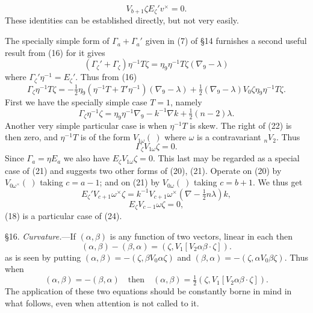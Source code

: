 \documentclass[11pt]{article}
\begin{document}
\begin{equation}V_{b+1}\zeta E_\zeta'v^\times=0.\tag{21}\end{equation}
These identities can be established directly, but not very easily.

The specially simple form of $\Gamma_a+\Gamma_a'$ given in (7) of \S14 furnishes a second useful result from (16) for it gives
\[
(\Gamma_\zeta'+\Gamma_\zeta)\eta^{-1}T\zeta=\eta_9\eta^{-1}T\zeta(\nabla_9-\lambda)
\]
where $\Gamma_\zeta'\eta^{-1}=E_\zeta'$. Thus from (16)
\begin{equation}\Gamma_\zeta\eta^{-1}T\zeta=-\tfrac12\eta_9(\eta^{-1}T+T'\eta^{-1})(\nabla_9-\lambda)+\tfrac12(\nabla_9-\lambda)V_0\zeta\eta_9\eta^{-1}T\zeta.\tag{22}\end{equation}
First we have the specially simple case $T=1$, namely
\begin{equation}\Gamma_\zeta\eta^{-1}\zeta=\eta_9\eta^{-1}\nabla_9-k^{-1}\nabla k+\tfrac12(n-2)\lambda.\tag{23}\end{equation}
Another very simple particular case is when $\eta^{-1}T$ is skew. The right of (22) is then zero, and $\eta^{-1}T$ is of the form $V_{1\omega}(\ )$ where $\omega$ is a contravariant ${}_nV_2$. Thus
\[
\Gamma_\zeta V_{1\omega}\zeta=0.
\]
Since $\Gamma_a=\eta E_a$ we also have $E_\zeta V_{1\omega}\zeta=0$. This last may be regarded as a special case of (21) and suggests two other forms of (20), (21). Operate on (20) by $V_{0\omega^\times}(\ )$ taking $c=a-1$; and on (21) by $V_{0\omega}(\ )$ taking $c=b+1$. We thus get
\begin{equation}E_\zeta'V_{c+1}\omega^\times\zeta=k^{-1}V_{c+1}\omega^\times(\nabla-\tfrac12n\lambda)k,\tag{24}\end{equation}
\begin{equation}E_\zeta V_{c-1}\omega\zeta=0,\tag{25}\end{equation}
(18) is a particular case of (24).

\indent \S16. \emph{Curvature.}---If $(\alpha,\beta)$ is any function of two vectors, linear in each then
\begin{equation}(\alpha,\beta)-(\beta,\alpha)=(\zeta,V_1[V_2\alpha\beta\mathbin{\cdot}\zeta]).\tag{1}\end{equation}
as is seen by putting $(\alpha,\beta)=-(\zeta,\beta V_0\alpha\zeta)$ and $(\beta,\alpha)=-(\zeta,\alpha V_0\beta\zeta)$. Thus when
\begin{equation}(\alpha,\beta)=-(\beta,\alpha)\quad\text{then}\quad(\alpha,\beta)=\tfrac12(\zeta,V_1[V_2\alpha\beta\mathbin{\cdot}\zeta]).\tag{2}\end{equation}
The application of these two equations should be constantly borne in mind in what follows, even when attention is not called to it.
\end{document}
